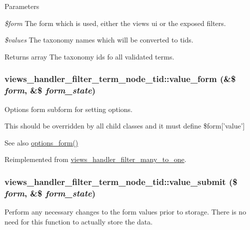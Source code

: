 \begin{DoxyParams}{Parameters}
\item[{\em \$form}]The form which is used, either the views ui or the exposed filters. \item[{\em \$values}]The taxonomy names which will be converted to tids.\end{DoxyParams}
\begin{DoxyReturn}{Returns}
array The taxonomy ids fo all validated terms. 
\end{DoxyReturn}
\hypertarget{classviews__handler__filter__term__node__tid_a3259d8a91cb0c13c51c02942b267b131}{
\subsubsection[{value\_\-form}]{\setlength{\rightskip}{0pt plus 5cm}views\_\-handler\_\-filter\_\-term\_\-node\_\-tid::value\_\-form (\&\$ {\em form}, \/  \&\$ {\em form\_\-state})}}
\label{classviews__handler__filter__term__node__tid_a3259d8a91cb0c13c51c02942b267b131}
Options form subform for setting options.

This should be overridden by all child classes and it must define \$form\mbox{[}'value'\mbox{]}

\begin{DoxySeeAlso}{See also}
\hyperlink{classviews__handler__filter_af14c69367162057a32709a6340de0988}{options\_\-form()} 
\end{DoxySeeAlso}


Reimplemented from \hyperlink{classviews__handler__filter__many__to__one_a6c5e3bbabc2ed73418f835195c10f451}{views\_\-handler\_\-filter\_\-many\_\-to\_\-one}.\hypertarget{classviews__handler__filter__term__node__tid_a48244c2456ac78e1855d9a48632ce045}{
\subsubsection[{value\_\-submit}]{\setlength{\rightskip}{0pt plus 5cm}views\_\-handler\_\-filter\_\-term\_\-node\_\-tid::value\_\-submit (\$ {\em form}, \/  \&\$ {\em form\_\-state})}}
\label{classviews__handler__filter__term__node__tid_a48244c2456ac78e1855d9a48632ce045}
Perform any necessary changes to the form values prior to storage. There is no need for this function to actually store the data. 

